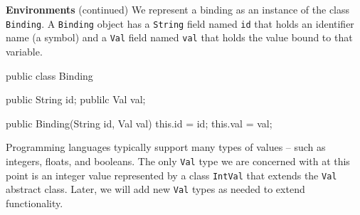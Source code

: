 \begin{minipage}[t]{\sw}
\slidenumber
\LARGE
{\bf Environments} (continued)\exx
We represent a binding as an instance of the class \verb'Binding'.
A \verb'Binding' object has a \verb'String' field named \verb'id'
that holds an identifier name (a symbol)
and a \verb'Val' field named \verb'val'
that holds the value bound to that variable.
\Large
\begin{qv}
public class Binding {

    public String id;
    publilc Val val;

    public Binding(String id, Val val) {
        this.id = id;
        this.val = val;
    }

}
\end{qv}
\LARGE
Programming languages typically support many types of values --
such as integers, floats, and booleans.
The only \verb'Val' type we are concerned with at this point
is an integer value represented by a class \verb'IntVal'
that extends the \verb'Val' abstract class.
Later, we will add new \verb'Val' types as needed
to extend functionality.\exx
\end{minipage}
